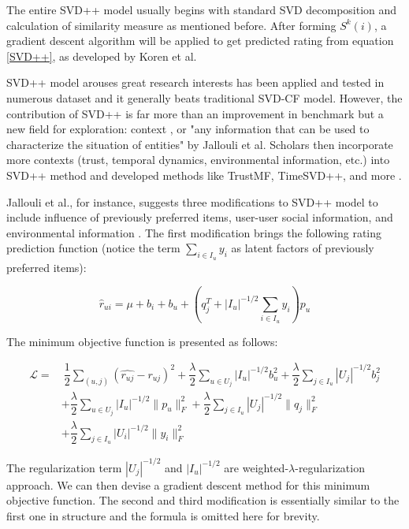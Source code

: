 \documentclass[letter paper, 11pt]{article}
\begin{document}
	The entire SVD++ model usually begins with standard SVD decomposition and calculation of similarity measure as mentioned before. After forming $S^k(i)$, a gradient descent algorithm will be applied to get predicted rating from equation \ref{SVD++}, as developed by Koren et al\cite{koren2010}.  
	
	SVD++ model arouses great research interests has been applied and tested in numerous dataset \cite{SVD++performance} \cite{korenFactorization} and it generally beats traditional SVD-CF model. However, the contribution of SVD++ is far more than an improvement in benchmark but a new field for exploration: context \cite{contextual}, or "any information that can be used to characterize the situation of entities" by Jallouli et al. Scholars then incorporate more contexts (trust, temporal dynamics, environmental information, etc.) into SVD++ method and developed methods like TrustMF, TimeSVD++, and more \cite{contextual} \cite{review}.
	
			
	Jallouli et al., for instance, suggests three modifications to SVD++ model to include influence of previously preferred items, user-user social information, and environmental information \cite{contextual}. The first modification brings the following rating prediction function (notice the term $\sum_{i \in I_u} y_i$ as latent factors of previously preferred items):
	
	\begin{equation}
		\hat{r}_{ui} = \mu + b_i + b_u  + (q_j^T + |I_u|^{-1/2}\sum_{i \in I_u} y_i) p_u
	\end{equation}
	
	The minimum objective function is presented as follows:
	
	\begin{equation}
		\begin{split}
			\mathcal{L} = &\ \dfrac{1}{2} \sum_{(u, j)} (\hat{r_{uj}} - r_{uj})^2 + \dfrac{\lambda}{2} \sum_{u \in U_j} |I_u|^{-1/2} b_u^2 + \dfrac{\lambda}{2} \sum_{j \in I_u} |U_j|^{-1/2} b_j^2 \\
			& + \dfrac{\lambda}{2} \sum_{u \in U_j} |I_u|^{-1/2} \|p_u\|_F^{2} + \dfrac{\lambda}{2} \sum_{j \in I_u} |U_j|^{-1/2} \|q_j\|_F^{2} \\
			& + \dfrac{\lambda}{2} \sum_{j \in I_u} |U_i|^{-1/2} \|y_i\|_F^{2}
		\end{split}
	\end{equation}
	
	The regularization term $|U_j|^{-1/2}$ and $|I_u|^{-1/2}$ are weighted-$\lambda$-regularization approach. We can then devise a gradient descent method for this minimum objective function. The second and third modification is essentially similar to the first one in structure and the formula is omitted here for brevity.
	
\end{document}
